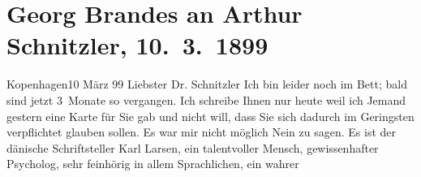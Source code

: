 

         
         \renewcommand{\erwaehntePersonen}{Personen: Theodor Barth, Georg Brandes, Paul Goldmann, Karl Larsen, Peter Nansen, Annie Vivanti}
         \renewcommand{\erwaehnteInstitutionen}{Institutionen: Die Nation, Frankfurter Zeitung, Neue Freie Presse}
         \renewcommand{\erwaehnteOrte}{Orte: Deutschland, Dänemark, Europa, Italien, Kopenhagen, Südschleswig, Wien}
         \renewcommand{\erwaehnteWerke}{Werke: Annie Vivanti, Das Dänentum in Südjütland, Das Vermächtnis. Schauspiel in drei Akten, Der grüne Kakadu. Groteske in einem Akt, Die Zukunft, Samlede Skrifter [Gesammelte Werke], Tilskueren, Ungdomsvers [Jugendgedichte], [Gedichte]}
               \section[Georg Brandes an Arthur Schnitzler, 10. 3. 1899]{ Georg Brandes an Arthur Schnitzler, 10. 3. 1899}\nopagebreak{}\rehead{ }\begin{ledgroupsized}[t]{13cm}\normalsize\beginnumbering \toendnotes[C]{\smallbreak\pagebreak[2]} 
\toendnotes[C]{\smallbreak}\pstart
           \raggedleft{}{\pb}Kopenhagen10 März 99\pend
           \pstart{}Liebster Dr. Schnitzler\pend\pstart
           Ich bin leider noch im Bett; bald sind jetzt 3 Monate so vergangen. Ich schreibe
               Ihnen nur heute weil ich Jemand gestern eine Karte für Sie gab und nicht will, dass Sie sich dadurch
               im Geringsten verpflichtet glauben sollen. Es war mir nicht möglich Nein zu sagen. Es
               ist der dänische Schriftsteller Karl Larsen, ein talentvoller Mensch,
               gewissenhafter Psycholog, sehr feinhörig in allem Sprachlichen, ein wahrer

\end{ledgroupsized}
